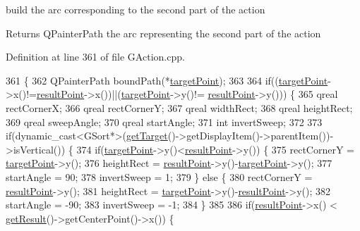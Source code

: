 build the arc corresponding to the second part of the action 

\begin{DoxyReturn}{Returns}
Q\+Painter\+Path the arc representing the second part of the action 
\end{DoxyReturn}


Definition at line 361 of file G\+Action.\+cpp.


\begin{DoxyCode}
361                                       \{
362     QPainterPath boundPath(*\hyperlink{classGAction_ad6992ac8b540932c370f5b46c48bbe70}{targetPoint});
363 
364     \textcolor{keywordflow}{if}((\hyperlink{classGAction_ad6992ac8b540932c370f5b46c48bbe70}{targetPoint}->x()!=\hyperlink{classGAction_a08d6b4a2f2d04a46861dafbe38897d8a}{resultPoint}->x())||(\hyperlink{classGAction_ad6992ac8b540932c370f5b46c48bbe70}{targetPoint}->y()!=
      \hyperlink{classGAction_a08d6b4a2f2d04a46861dafbe38897d8a}{resultPoint}->y())) \{
365         qreal rectCornerX;
366         qreal rectCornerY;
367         qreal widthRect;
368         qreal heightRect;
369         qreal sweepAngle;
370         qreal startAngle;
371         \textcolor{keywordtype}{int} invertSweep;
372 
373         \textcolor{keywordflow}{if}(dynamic\_cast<GSort*>(\hyperlink{classGAction_ac7aff6bc03be3791a8a20a914aae5b2c}{getTarget}()->getDisplayItem()->parentItem())->isVertical()) \{
374             \textcolor{keywordflow}{if}(\hyperlink{classGAction_ad6992ac8b540932c370f5b46c48bbe70}{targetPoint}->y()<\hyperlink{classGAction_a08d6b4a2f2d04a46861dafbe38897d8a}{resultPoint}->y()) \{
375                 rectCornerY = \hyperlink{classGAction_ad6992ac8b540932c370f5b46c48bbe70}{targetPoint}->y();
376                 heightRect = \hyperlink{classGAction_a08d6b4a2f2d04a46861dafbe38897d8a}{resultPoint}->y()-\hyperlink{classGAction_ad6992ac8b540932c370f5b46c48bbe70}{targetPoint}->y();
377                 startAngle = 90;
378                 invertSweep = 1;
379             \} \textcolor{keywordflow}{else} \{
380                 rectCornerY = \hyperlink{classGAction_a08d6b4a2f2d04a46861dafbe38897d8a}{resultPoint}->y();
381                 heightRect = \hyperlink{classGAction_ad6992ac8b540932c370f5b46c48bbe70}{targetPoint}->y()-\hyperlink{classGAction_a08d6b4a2f2d04a46861dafbe38897d8a}{resultPoint}->y();
382                 startAngle = -90;
383                 invertSweep = -1;
384             \}
385 
386             \textcolor{keywordflow}{if}(\hyperlink{classGAction_a08d6b4a2f2d04a46861dafbe38897d8a}{resultPoint}->x() < \hyperlink{classGAction_ae1ed003118c8333c6afa2e8d30e3dc07}{getResult}()->getCenterPoint()->x()) \{

\end{DoxyCode}
